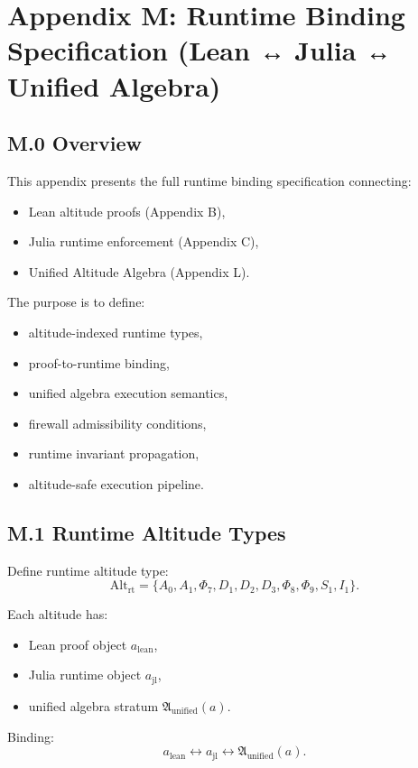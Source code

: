 \appendix
\section*{Appendix M: Runtime Binding Specification (Lean ↔ Julia ↔ Unified Algebra)}

\subsection*{M.0 Overview}

This appendix presents the full runtime binding specification connecting:
\begin{itemize}
    \item Lean altitude proofs (Appendix B),
    \item Julia runtime enforcement (Appendix C),
    \item Unified Altitude Algebra (Appendix L).
\end{itemize}

The purpose is to define:
\begin{itemize}
    \item altitude-indexed runtime types,
    \item proof-to-runtime binding,
    \item unified algebra execution semantics,
    \item firewall admissibility conditions,
    \item runtime invariant propagation,
    \item altitude-safe execution pipeline.
\end{itemize}

\subsection*{M.1 Runtime Altitude Types}

Define runtime altitude type:
\[
\mathrm{Alt}_{\mathrm{rt}} =
\{A_0, A_1, \Phi_7, D_1, D_2, D_3, \Phi_8, \Phi_9, S_1, I_1\}.
\]

Each altitude has:
\begin{itemize}
    \item Lean proof object $a_{\mathrm{lean}}$,
    \item Julia runtime object $a_{\mathrm{jl}}$,
    \item unified algebra stratum $\mathfrak{A}_{\mathrm{unified}}(a)$.
\end{itemize}

Binding:
\[
a_{\mathrm{lean}} \leftrightarrow a_{\mathrm{jl}} \leftrightarrow
\mathfrak{A}_{\mathrm{unified}}(a).
\]

